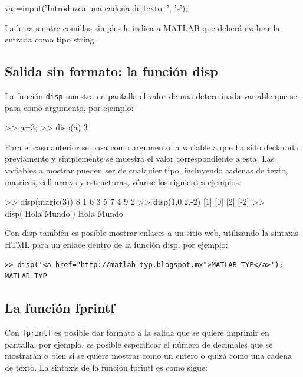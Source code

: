 \begin{matlab}
var=input('Introduzca una cadena de texto: ', 's');
\end{matlab}

La letra s entre comillas simples le indica a MATLAB que deberá evaluar
la entrada como tipo string.

\subsection{Salida sin formato: la función disp}\label{salida-sin-formato-la-funcion-disp}

La función \texttt{disp} muestra en pantalla el valor de una determinada variable
que se pasa como argumento, por ejemplo:

\begin{matlab}
>> a=3;
>> disp(a)
     3
\end{matlab}

Para el caso anterior se pasa como argumento la variable a que ha sido
declarada previamente y simplemente se muestra el valor correspondiente
a esta. Las variables a mostrar pueden ser de cualquier tipo, incluyendo
cadenas de texto, matrices, cell arrays y estructuras, véanse los
siguientes ejemplos:

\begin{matlab}
>> disp(magic(3))
     8     1     6
     3     5     7
     4     9     2
>> disp({1,0,2,-2})
    [1]    [0]    [2]    [-2]
>> disp('Hola Mundo')
Hola Mundo
\end{matlab}

Con disp también es posible mostrar enlaces a un sitio web, utilizando
la sintaxis HTML para un enlace dentro de la función disp, por ejemplo:

\begin{verbatim}
>> disp('<a href="http://matlab-typ.blogspot.mx">MATLAB TYP</a>');
MATLAB TYP
\end{verbatim}

\subsection{La función fprintf}\label{la-funcion-fprintf}

Con \texttt{fprintf} es posible dar formato a la salida que se quiere
imprimir en pantalla, por ejemplo, es posible especificar el número de
decimales que se mostrarán o bien si se quiere mostrar como un entero o
quizá como una cadena de texto. La sintaxis de la función fprintf es
como sigue:

